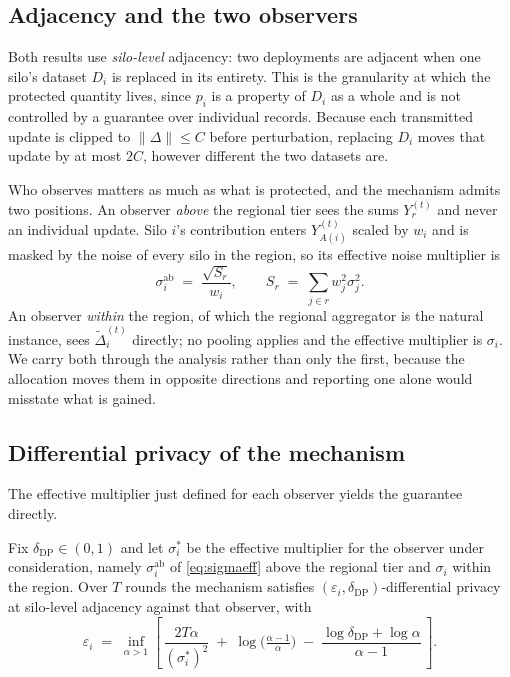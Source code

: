 \documentclass[acmsmall,screen,review,anonymous]{acmart}
\theoremstyle{acmdefinition}%
\begin{document}
\subsection{Adjacency and the two observers}

Both results use \emph{silo-level} adjacency: two deployments are adjacent when one
silo's dataset $D_i$ is replaced in its entirety. This is the granularity at which
the protected quantity lives, since $p_i$ is a property of $D_i$ as a whole and is
not controlled by a guarantee over individual records. Because each transmitted
update is clipped to $\|\Delta\| \le C$ before perturbation, replacing $D_i$ moves
that update by at most $2C$, however different the two datasets are.

Who observes matters as much as what is protected, and the mechanism admits two
positions. An observer \emph{above} the regional tier sees the sums $Y_r^{(t)}$ and
never an individual update. Silo $i$'s contribution enters $Y_{A(i)}^{(t)}$ scaled
by $w_i$ and is masked by the noise of every silo in the region, so its effective
noise multiplier is
\begin{equation}
\sigma^{\mathrm{ab}}_i \;=\; \frac{\sqrt{S_r}}{w_i},
\qquad S_r \;=\; \sum_{j \in r} w_j^2 \sigma_j^2 .
\label{eq:sigmaeff}
\end{equation}
An observer \emph{within} the region, of which the regional aggregator is the
natural instance, sees $\tilde{\Delta}_i^{(t)}$ directly; no pooling applies and
the effective multiplier is $\sigma_i$. We carry both through the analysis rather
than only the first, because the allocation moves them in opposite directions and
reporting one alone would misstate what is gained.

\subsection{Differential privacy of the mechanism}

The effective multiplier just defined for each observer yields the guarantee directly.

\begin{theorem}
\label{thm:dp}
Fix $\delta_{\mathrm{DP}} \in (0,1)$ and let $\sigma^{\ast}_i$ be the effective
multiplier for the observer under consideration, namely $\sigma^{\mathrm{ab}}_i$
of \eqref{eq:sigmaeff} above the regional tier and $\sigma_i$ within the region.
Over $T$ rounds the mechanism satisfies $(\varepsilon_i,
\delta_{\mathrm{DP}})$-differential privacy at silo-level adjacency against that
observer, with
\begin{equation}
\varepsilon_i \;=\; \inf_{\alpha > 1}
\left[\, \frac{2 T \alpha}{(\sigma^{\ast}_i)^2}
\;+\; \log\!\Big(\tfrac{\alpha - 1}{\alpha}\Big)
\;-\; \frac{\log \delta_{\mathrm{DP}} + \log \alpha}{\alpha - 1} \,\right].
\label{eq:dpeps}
\end{equation}
\end{theorem}
\end{document}
